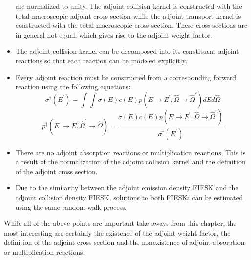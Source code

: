 \begin{itemize}
    are normalized to unity. The adjoint collision kernel is constructed
    with the total macroscopic adjoint cross section while the adjoint
    transport kernel is constructed with the total macroscopic cross section.
    These cross sections are in general not equal, which gives rise to the
    adjoint weight factor.
  \item The adjoint collision kernel can be decomposed into its constituent
    adjoint reactions so that each reaction can be modeled explicitly.
  \item Every adjoint reaction must be constructed from a corresponding
    forward reaction using the following equations:
    \begin{equation*}
      \sigma^{\dagger}(E^{'}) = \int\int \sigma(E)c(E)
      p(E \to E^{'}, \hat{\Omega} \to \hat{\Omega}^{'}) dE d\hat{\Omega}
    \end{equation*}
    \begin{equation*}
      p^{\dagger}(E^{'} \to E, \hat{\Omega}^{'} \to \hat{\Omega}) = 
      \frac{\sigma(E)c(E)p(E \to E^{'}, \hat{\Omega} \to \hat{\Omega}^{'})}
      {\sigma^{\dagger}(E^{'})}
    \end{equation*}
  \item There are no adjoint absorption reactions or multiplication reactions.
    This is a result of the normalization of the adjoint collision kernel and
    the definition of the adjoint cross section.   
  \item Due to the similarity between the adjoint emission density FIESK and
    the adjoint collision density FIESK, solutions to both FIESKs can be 
    estimated using the same random walk process.
\end{itemize}

While all of the above points are important take-aways from this chapter, the
most interesting are certainly the existence of the adjoint weight factor, 
the definition of the adjoint cross section and the nonexistence of adjoint
absorption or multiplication reactions. 
